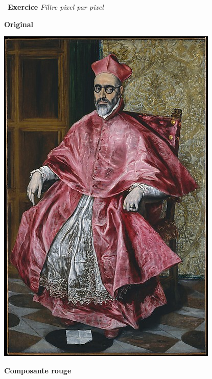\documentclass[a4paper, french, 12pt]{article}
\newcounter{exo}
\newenvironment{exercice}[1]
{\par \medskip   \addtocounter{exo}{1} \noindent  
\begin{bclogo}[arrondi =0.1,   noborder = true, logo=\bccrayon, marge=4]{~\textbf{Exercice} \textbf{\theexo} {\itshape #1} }  \par}
{
\end{bclogo}
 \par \bigskip }
\begin{document}
\begin{exercice}{Filtre pixel par pixel}
\begin{enumerate}
\begin{enumerate}
\begin{minipage}{0.45\linewidth}
\begin{center}
\textbf{Original}

\includegraphics[scale=0.5]{images/cardinal.jpg}
\end{center}
\end{minipage}\hfill
\begin{minipage}{0.45\linewidth}
\begin{center}
\textbf{Composante rouge} 


\end{center}
\end{minipage}
\end{enumerate}
\end{enumerate}
\end{exercice}
\end{document}
